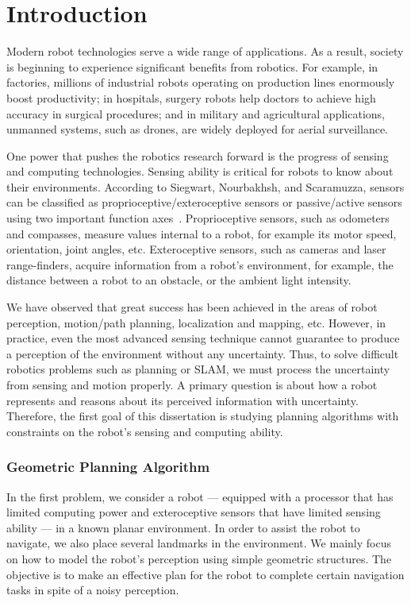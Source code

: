 \chapter{Introduction} 
\label{chp:intro}

Modern robot technologies serve a wide range of applications. 
%
As a result, society is beginning to experience significant benefits from robotics.
%
For example, in factories, millions of industrial robots operating on production lines enormously boost productivity; 
in hospitals, surgery robots help doctors to achieve high accuracy in surgical procedures; 
and in military and agricultural applications, unmanned systems, such as drones, are widely deployed for aerial surveillance.


%
One power that pushes the robotics research forward is the progress of sensing and computing technologies. 
%
Sensing ability is critical for robots to know about their environments. 
According to Siegwart, Nourbakhsh, and Scaramuzza, sensors can be classified as proprioceptive/exteroceptive sensors or passive/active sensors using two important function axes~\cite{SieNouSca11}.
%
Proprioceptive sensors, such as odometers and
compasses, measure values internal to a robot, for example its motor speed, orientation, joint angles, etc.
%
Exteroceptive sensors, such as cameras and laser range-finders, acquire information from a robot's environment, for example, the distance between a robot to an obstacle, or the ambient light intensity. 

%
We have observed that great success has been achieved in the areas of robot perception, motion/path planning, localization and mapping, etc. 
%
However, in practice, even the most advanced sensing technique cannot guarantee to produce a perception of the
environment without any uncertainty.  
%
Thus, to solve difficult robotics problems such as planning or SLAM, we must process the uncertainty from sensing and motion properly.
%
A primary question is about how a robot represents and reasons about its perceived information with uncertainty.
%
Therefore, the first goal of this dissertation is studying planning algorithms with constraints on the robot's sensing and computing ability.

\subsection{Geometric Planning Algorithm}
In the first problem, we consider a robot --- equipped with a processor that has limited computing power and exteroceptive sensors that have limited sensing
ability --- in a known planar environment.
In order to assist the robot to navigate, we also place several landmarks in the environment.
We mainly focus on how to model the robot's perception using simple
geometric structures.
The objective is to make an effective plan for the robot to complete certain navigation tasks 
in spite of a noisy perception.

